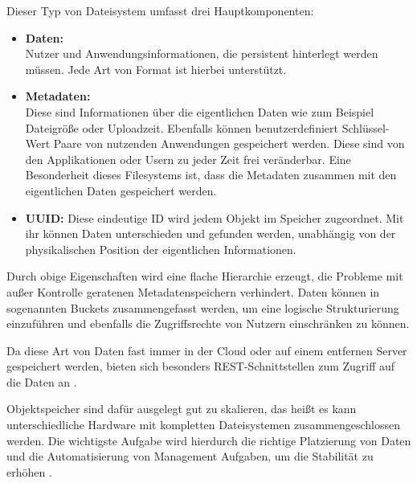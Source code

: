 Dieser Typ von Dateisystem umfasst drei Hauptkomponenten:

\begin{itemize}
	\item \textbf{Daten:}\\
	 Nutzer und Anwendungsinformationen, die persistent hinterlegt werden müssen. Jede Art von Format ist hierbei unterstützt.
	\item \textbf{Metadaten:}\\
	 Diese sind Informationen über die eigentlichen Daten wie zum Beispiel Dateigröße oder Uploadzeit. Ebenfalls können benutzerdefiniert Schlüssel-Wert Paare von nutzenden Anwendungen gespeichert werden. Diese sind von den Applikationen oder Usern zu jeder Zeit frei veränderbar. Eine Besonderheit dieses Filesystems ist, dass die Metadaten zusammen mit den eigentlichen Daten gespeichert werden.
	\item \textbf{\ac{UUID}:} Diese eindeutige ID wird jedem Objekt im Speicher zugeordnet. Mit ihr können Daten unterschieden  und gefunden werden, unabhängig von der physikalischen Position der eigentlichen Informationen.
\end{itemize}

Durch obige Eigenschaften wird eine flache Hierarchie erzeugt, die Probleme mit außer Kontrolle geratenen Metadatenspeichern verhindert. Daten können in sogenannten Buckets zusammengefasst werden, um eine logische Strukturierung einzuführen und ebenfalls die Zugriffsrechte von Nutzern einschränken zu können.  

Da diese Art von Daten fast immer in der Cloud oder auf einem entfernen Server gespeichert werden, bieten sich besonders REST-Schnittstellen zum Zugriff auf die Daten an \parencite[S. 4f]{Rios.2017}.

Objektspeicher sind dafür ausgelegt gut zu skalieren, das heißt es kann unterschiedliche Hardware mit kompletten Dateisystemen zusammengeschlossen werden. Die wichtigste Aufgabe wird hierdurch die richtige Platzierung von Daten und die Automatisierung von Management Aufgaben, um die Stabilität zu erhöhen \parencite[Kap. 1, Object Storage]{varma.2015}.
